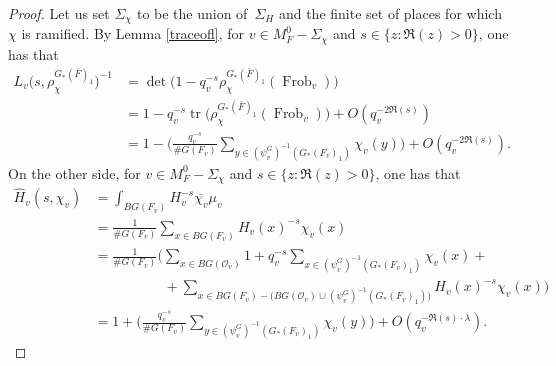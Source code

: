 \documentclass[a4paper,english,12pt]{amsart}
\newcommand{\GG}{ G}
\newcommand{\oF}{\overline F}
\newcommand{\Fv}{F_v}
\newcommand{\Ov}{\mathcal O _v}
\newcommand{\vMF}{v\in M_F}
\newcommand{\vMFz}{v\in M_F ^0}
\newcommand{\wH}{\widehat H}
\DeclareMathOperator{\Tr}{tr}
\DeclareMathOperator{\Frob}{Frob}
\DeclareMathOperator{\age}{age}
\numberwithin{equation}{subsection}
\begin{document}
\begin{proof}
Let us set $\Sigma_{\chi}$ to be the union of~$\Sigma_H$ and the finite set of places for which~$\chi$ is ramified. By Lemma \ref{traceofl}, for $\vMFz-\Sigma_\chi$ and $s\in\{z:\Re(z)>0\}$, one has that
\begin{align*}
L_v\big(s,\rho^{G_*(\oF)_1}_{\chi}\big)^{-1}&=\det\big(1-q_v^{-s}\rho^{G_*(\oF)_1}_{\chi}(\Frob_v)\big)\\
&=1-q_v^{-s}\Tr\big(\rho^{G_*(\oF)_1}_{\chi}(\Frob_v)\big)+ O(q_v^{-2\Re(s)})\\
&=1-\bigg(\frac{q_v^{-s}}{\#G(F_v)}\sum_{y\in(\psi^G_v)^{-1}(G_*(F_v)_1)}\chi_v(y) \bigg)+O(q_v^{-2\Re(s)}).
\end{align*}
On the other side, for $\vMF^0-\Sigma_{\chi}$ and $s\in\{z:\Re(z)>0\}$, one has that \begin{align*}
\wH_v(s,\chi_v)&=\int_{BG(F_v)}H_v^{-s}\overline{\chi_v}\mu_v\\
&=\frac{1}{\#G(F_v)}\sum_{x\in BG(F_v)} H_v(x)^{-s}\chi_v(x)\\
&=\frac{1}{\# G(F_v)}\bigg(\sum_{x\in B\GG(\Ov)}1 + q_v^{-s}\sum_{x\in (\psi^G_v)^{-1}(G_*(F_v)_1)}\chi_v(x)+\\&\quad\quad\quad\quad\quad+\sum_{x\in BG(F_v)-\big(B\GG(\Ov)\cup(\psi^G_v)^{-1}(G_*(F_v)_1) \big)}H_v(x)^{-s}\chi_v(x)\bigg)\\
&=1+\bigg(\frac{q_v^{-s}}{\#G(F_v)}\sum_{y\in(\psi_v^G)^{-1}(G_*(\Fv)_1)}\chi_v(y)\bigg)+ O(q_v^{-\Re(s)\cdot\lambda}).
\end{align*}

\end{proof}
\end{document}
